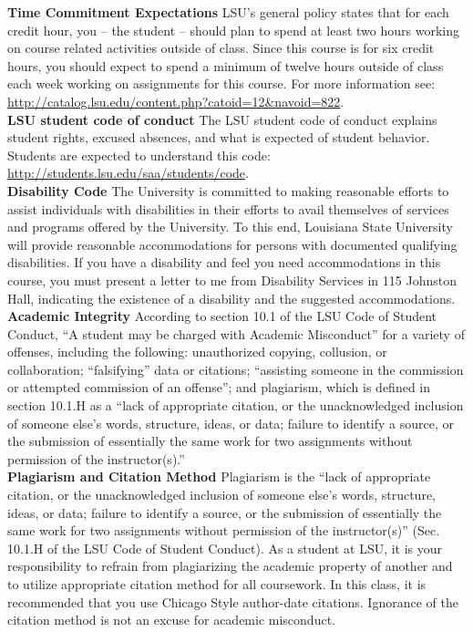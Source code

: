 \documentclass[11pt,article,oneside]{memoir}
\begin{document}
\clearpage

\noindent \textbf{Time Commitment Expectations}
LSU's general policy states that for each credit hour, you -- the student -- should plan to
spend at least two hours working on course related activities outside of class. Since this course is for six credit hours, you should expect to spend a minimum of twelve hours outside of class each week working on assignments for this course. For more information see: 
\url{http://catalog.lsu.edu/content.php?catoid=12&navoid=822}.
\\

\noindent \textbf{LSU student code of conduct}
The LSU student code of conduct explains student rights, excused absences, and what is expected of student behavior. Students are expected to understand this code:  \url{http://students.lsu.edu/saa/students/code}.
\\ %

\noindent \textbf{Disability Code}
The University is committed to making reasonable efforts to assist individuals with disabilities in
their efforts to avail themselves of services and programs offered by the University. To this end,
Louisiana State University will provide reasonable accommodations for persons with
documented qualifying disabilities. If you have a disability and feel you need accommodations in
this course, you must present a letter to me from Disability Services in 115 Johnston Hall,
indicating the existence of a disability and the suggested accommodations.
\\

\noindent \textbf{Academic Integrity}
According to section 10.1 of the LSU Code of Student Conduct, ``A student may be charged with Academic Misconduct'' for a variety of offenses, including the following: unauthorized copying, collusion, or collaboration; ``falsifying'' data or citations; ``assisting someone in the commission or attempted commission of an offense''; and plagiarism, which is defined in section 10.1.H as a ``lack of appropriate citation, or the unacknowledged inclusion of someone else's words, structure, ideas, or data; failure to identify a source, or the submission of essentially the same work for two assignments without permission of the instructor(s).''
\\

\noindent \textbf{Plagiarism and Citation Method}
Plagiarism is the ``lack of appropriate citation, or the unacknowledged inclusion of someone else's words, structure, ideas, or data; failure to identify a source, or the submission of essentially the same work for two assignments without permission of the instructor(s)'' (Sec. 10.1.H of the LSU Code of Student Conduct). As a student at LSU, it is your responsibility to refrain from plagiarizing the academic property of another and to utilize appropriate citation method for all coursework. In this class, it is recommended that you use Chicago Style author-date citations. Ignorance of the citation method is not an excuse for academic misconduct.
\end{document}
